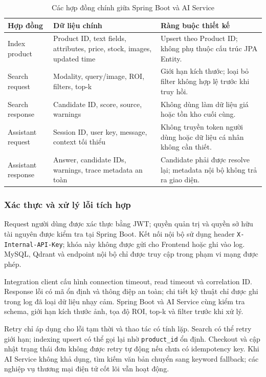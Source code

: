 \begin{table}[H]
    \centering
    \caption{Các hợp đồng chính giữa Spring Boot và AI Service}
    \label{tab:spring-ai-contracts}
    \begin{tabularx}{\textwidth}{|p{}|p{}|X|}
        \hline
        \textbf{Hợp đồng} & \textbf{Dữ liệu chính} & \textbf{Ràng buộc thiết kế} \\
        \hline
        Index product & Product ID, text fields, attributes, price, stock, images, updated time & Upsert theo Product ID; không phụ thuộc cấu trúc JPA Entity. \\
        \hline
        Search request & Modality, query/image, ROI, filters, top-k & Giới hạn kích thước; loại bỏ filter không hợp lệ trước khi truy hồi. \\
        \hline
        Search response & Candidate ID, score, source, warnings & Không dùng làm dữ liệu giá hoặc tồn kho cuối cùng. \\
        \hline
        Assistant request & Session ID, user key, message, context tối thiểu & Không truyền token người dùng hoặc dữ liệu cá nhân không cần thiết. \\
        \hline
        Assistant response & Answer, candidate IDs, warnings, trace metadata an toàn & Candidate phải được resolve lại; metadata nội bộ không trả ra giao diện. \\
        \hline
    \end{tabularx}
\end{table}

\subsubsection{Xác thực và xử lý lỗi tích hợp}

Request người dùng được xác thực bằng JWT; quyền quản trị và quyền sở hữu tài nguyên được kiểm tra tại Spring Boot. Kết nối nội bộ sử dụng header \texttt{X-Internal-API-Key}; khóa này không được gửi cho Frontend hoặc ghi vào log. MySQL, Qdrant và endpoint nội bộ chỉ được truy cập trong phạm vi mạng được phép.

Integration client cấu hình connection timeout, read timeout và correlation ID. Response lỗi có mã ổn định và thông điệp an toàn; chi tiết kỹ thuật chỉ được ghi trong log đã loại dữ liệu nhạy cảm. Spring Boot và AI Service cùng kiểm tra schema, giới hạn kích thước ảnh, tọa độ ROI, top-k và filter trước khi xử lý.

Retry chỉ áp dụng cho lỗi tạm thời và thao tác có tính lặp. Search có thể retry giới hạn; indexing upsert có thể gọi lại nhờ \texttt{product\_id} ổn định. Checkout và cập nhật trạng thái đơn không được retry tự động nếu chưa có idempotency key. Khi AI Service không khả dụng, tìm kiếm văn bản chuyển sang keyword fallback; các nghiệp vụ thương mại điện tử cốt lõi vẫn hoạt động.

